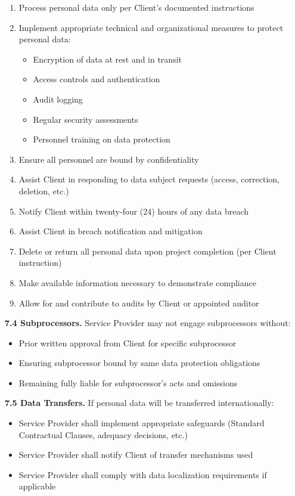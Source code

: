 \documentclass[11pt,a4paper]{article}
\begin{document}
\begin{enumerate}[label=\alph*)]
\item Process personal data only per Client's documented instructions
\item Implement appropriate technical and organizational measures to protect personal data:
\begin{itemize}
\item Encryption of data at rest and in transit
\item Access controls and authentication
\item Audit logging
\item Regular security assessments
\item Personnel training on data protection
\end{itemize}
\item Ensure all personnel are bound by confidentiality
\item Assist Client in responding to data subject requests (access, correction, deletion, etc.)
\item Notify Client within twenty-four (24) hours of any data breach
\item Assist Client in breach notification and mitigation
\item Delete or return all personal data upon project completion (per Client instruction)
\item Make available information necessary to demonstrate compliance
\item Allow for and contribute to audits by Client or appointed auditor
\end{enumerate}

\textbf{7.4 Subprocessors.} Service Provider may not engage subprocessors without:
\begin{itemize}
\item Prior written approval from Client for specific subprocessor
\item Ensuring subprocessor bound by same data protection obligations
\item Remaining fully liable for subprocessor's acts and omissions
\end{itemize}

\textbf{7.5 Data Transfers.} If personal data will be transferred internationally:
\begin{itemize}
\item Service Provider shall implement appropriate safeguards (Standard Contractual Clauses, adequacy decisions, etc.)
\item Service Provider shall notify Client of transfer mechanisms used
\item Service Provider shall comply with data localization requirements if applicable
\end{itemize}
\end{document}

